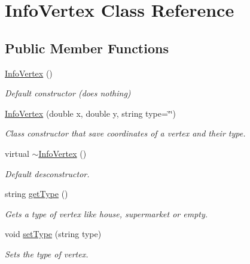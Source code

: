 \hypertarget{class_info_vertex}{}\section{Info\+Vertex Class Reference}
\label{class_info_vertex}
\subsection*{Public Member Functions}
\begin{DoxyCompactItemize}
\item 
\hypertarget{class_info_vertex_ab24cf5a6aec6669e880884e78f5b81c9}{}\label{class_info_vertex_ab24cf5a6aec6669e880884e78f5b81c9} 
\hyperlink{class_info_vertex_ab24cf5a6aec6669e880884e78f5b81c9}{Info\+Vertex} ()
\begin{DoxyCompactList}\small\item\em Default constructor (does nothing) \end{DoxyCompactList}\item 
\hyperlink{class_info_vertex_a2be3f8a7e1581a81d510c431daf18a27}{Info\+Vertex} (double x, double y, string type=\char`\"{}\char`\"{})
\begin{DoxyCompactList}\small\item\em Class constructor that save coordinates of a vertex and their type. \end{DoxyCompactList}\item 
\hypertarget{class_info_vertex_aa7a00064415f1ea04a624ef155c801a4}{}\label{class_info_vertex_aa7a00064415f1ea04a624ef155c801a4} 
virtual \hyperlink{class_info_vertex_aa7a00064415f1ea04a624ef155c801a4}{$\sim$\+Info\+Vertex} ()
\begin{DoxyCompactList}\small\item\em Default desconstructor. \end{DoxyCompactList}\item 
string \hyperlink{class_info_vertex_a6ec232d3de8b3f747d4ca57f1616bc78}{get\+Type} ()
\begin{DoxyCompactList}\small\item\em Gets a type of vertex like house, supermarket or empty. \end{DoxyCompactList}\item 
void \hyperlink{class_info_vertex_acb303f5d189b539e0b1b42c716ee0130}{set\+Type} (string type)
\begin{DoxyCompactList}\small\item\em Sets the type of vertex. \end{DoxyCompactList}\item 

\end{DoxyCompactItemize}
